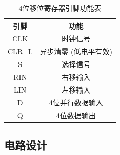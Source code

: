 \documentclass[12pt, a4paper]{ctexart}
\begin{document}
\begin{table}[H]
    \centering
    \begin{tabular}{|c|c|}
        \hline
        引脚 & 功能 \\
        \hline
        CLK    & 时钟信号 \\
        CLR\_L & 异步清零 (低电平有效) \\
        S      & 选择信号 \\
        RIN    & 右移输入 \\
        LIN    & 左移输入 \\
        D      & 4位并行数据输入 \\
        Q      & 4位数据输出 \\
        \hline
    \end{tabular}
    \caption{4位移位寄存器引脚功能表}
\end{table}

\subsection{电路设计}
\end{document}

